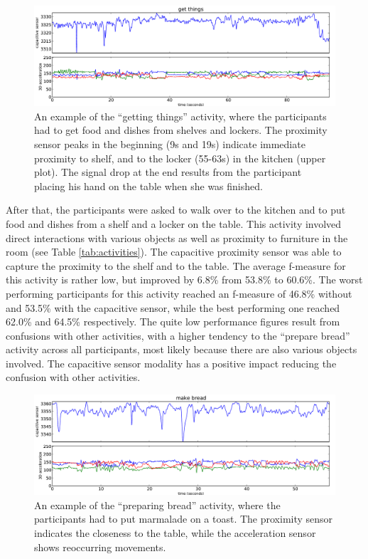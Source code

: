 \documentclass[runningheads,a4paper]{llncs}
\begin{document}
\begin{figure}
	\centering
		\includegraphics[width=\textwidth]{../Auswertung/images/tobias_4.pdf}
	\caption{An example of the ``getting things'' activity, where the participants had to get food and dishes from shelves and lockers. The proximity sensor peaks in the beginning (9s and 19s) indicate immediate proximity to shelf, and to the locker (55-63s) in the kitchen (upper plot). The signal drop at the end results from the participant placing his hand on the table when she was finished.}
	\label{fig:get_things}
\end{figure}

After that, the participants were asked to walk over to the kitchen and to put food and dishes from a shelf and a locker on the table. This activity involved direct interactions with various objects as well as proximity to furniture in the room (see Table \ref{tab:activities}). The capacitive proximity sensor was able to capture the proximity to the shelf and to the table. The average f-measure for this activity is rather low, but improved by 6.8\% from 53.8\% to 60.6\%. The worst performing participants for this activity reached an f-measure of 46.8\% without and 53.5\% with the capacitive sensor, while the best performing one reached 62.0\% and 64.5\% respectively. The quite low performance figures result from confusions with other activities, with a higher tendency to the ``prepare bread'' activity across all participants, most likely because there are also various objects involved. The capacitive sensor modality has a positive impact reducing the confusion with other activities.

\begin{figure}
	\centering
		\includegraphics[width=\textwidth]{../Auswertung/images/eugen_5.pdf}
	\caption{An example of the ``preparing bread'' activity, where the participants had to put marmalade on a toast. The proximity sensor indicates the closeness to the table, while the acceleration sensor shows reoccurring movements.}
	\label{fig:prep_bread}
\end{figure}
\end{document}
